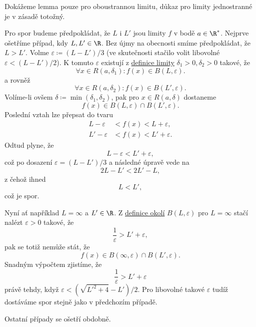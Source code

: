 \begin{lemproof}
	Dokážeme lemma pouze pro oboustrannou limitu, důkaz pro limity jednostranné je
	v zásadě totožný.

	Pro spor budeme předpokládat, že $L$ i $L'$ jsou limity $f$ v bodě $a \in
	\R^{*}$. Nejprve ošetříme případ, kdy $L,L' \in \R$. Bez újmy na obecnosti
	smíme předpokládat, že $L > L'$. Volme $\varepsilon \coloneqq (L-L') / 3$ (ve
	skutečnosti stačilo volit libovolné $\varepsilon < (L-L') / 2$). K tomuto
	$\varepsilon$ existují z \hyperref[def:oboustranna-limita-funkce]{definice
	limity} $\delta_1>0, \delta_2>0$ takové, že
	\[
		\forall x \in R(a,\delta_1): f(x) \in B(L,\varepsilon).
	\]
	a rovněž
	\[
		\forall x \in R(a,\delta_2): f(x) \in B(L',\varepsilon).
	\]
	Volíme-li ovšem $\delta \coloneqq \min(\delta_1,\delta_2)$, pak pro $x \in
		R(a,\delta)$ dostaneme
	\[
		f(x) \in B(L,\varepsilon) \cap B(L',\varepsilon).
	\]
	Poslední vztah lze přepsat do tvaru
	\begin{align*}
		L - \varepsilon  & < f(x) < L + \varepsilon,  \\
		L' - \varepsilon & < f(x) < L' + \varepsilon.
	\end{align*}
	Odtud plyne, že
	\[
		L - \varepsilon < L' + \varepsilon,
	\]
	což po dosazení $\varepsilon = (L - L') / 3$ a následné úpravě vede na
	\[
		2L - L' < 2L' - L,
	\]
	z čehož ihned
	\[
		L < L',
	\]
	což je spor.

	Nyní ať například $L = \infty$ a $L' \in \R$. Z
	\hyperref[def:okoli-a-prstencove-okoli-bodu]{definice okolí} $B(L,\varepsilon)$
	pro $L = \infty$ stačí nalézt $\varepsilon > 0$ takové, že
	\[
		\frac{1}{\varepsilon} > L' + \varepsilon,
	\]
	pak se totiž nemůže stát, že
	\[
		f(x) \in B(\infty,\varepsilon) \cap B(L',\varepsilon).
	\]
	Snadným výpočtem zjistíme, že
	\[
		\frac{1}{\varepsilon} > L' + \varepsilon
	\]
	právě tehdy, když $\varepsilon < (\sqrt{L'^2 + 4} - L') / 2$. Pro libovolné
	takové $\varepsilon$ tudíž dostáváme spor stejně jako v předchozím případě.

	Ostatní případy se ošetří obdobně.
\end{lemproof}

